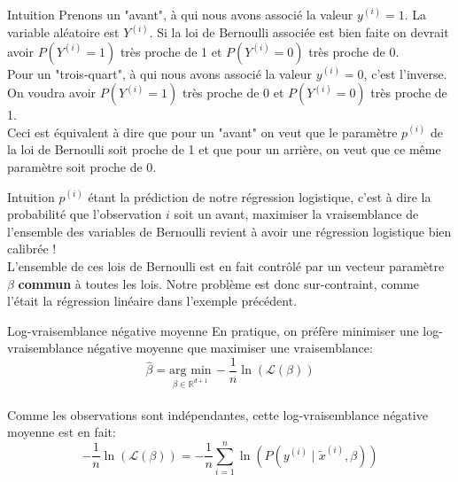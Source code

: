 \documentclass[10pt]{beamer}  %
\begin{document}
\begin{frame}{Intuition}
	Prenons un "avant", à qui nous avons associé la valeur $y^{(i)}=1$. La variable aléatoire est $Y^{(i)}$. Si la loi de Bernoulli associée est bien faite on devrait avoir $P(Y^{(i)} = 1)$ très proche de 1 et $P(Y^{(i)} = 0)$ très proche de 0. \\
	\vspace{0.5cm}
	\pause
	Pour un "trois-quart", à qui nous avons associé la valeur $y^{(i)}=0$, c'est l'inverse. On voudra avoir $P(Y^{(i)} = 1)$ très proche de 0 et $P(Y^{(i)} = 0)$ très proche de 1. \\
	\vspace{0.5cm}
	\pause
	Ceci est équivalent à dire que pour un "avant" on veut que le paramètre $p^{(i)}$ de la loi de Bernoulli soit proche de 1 et que pour un arrière, on veut que ce même paramètre soit proche de 0. \\
\end{frame}

\begin{frame}{Intuition}
	$p^{(i)}$ étant la prédiction de notre régression logistique, c'est à dire la probabilité que l'observation $i$ soit un avant, maximiser la vraisemblance de l'ensemble des variables de Bernoulli revient à avoir une régression logistique bien calibrée ! \\
	\vspace{0.5cm}
	\pause
	L'ensemble de ces lois de Bernoulli est en fait contrôlé par un vecteur paramètre $\beta$ \textbf{commun} à toutes les lois. Notre problème est donc sur-contraint, comme l'était la régression linéaire dans l'exemple précédent.	
\end{frame}

\begin{frame}{Log-vraisemblance négative moyenne}
	En pratique, on préfère minimiser une log-vraisemblance négative moyenne que maximiser une vraisemblance:
	\begin{equation}
		\hat{\beta} = \underset{\beta \in \mathbb{R}^{d+1}}{\text{arg min}} \, - \frac{1}{n} \ln{\left(\mathcal{L}(\beta)\right)}
		\nonumber
	\end{equation} \\
	\vspace{0.5cm}
	\pause
	Comme les observations sont indépendantes, cette log-vraisemblance négative moyenne est en fait:
	\begin{equation}
		- \frac{1}{n}\ln{\left(\mathcal{L}(\beta)\right)} = - \frac{1}{n} \sum_{i=1}^n \ln{\left(P(y^{(i)} \mid \tilde{x}^{(i)}, \beta)\right)}
		\nonumber
	\end{equation}
\end{frame}
\end{document}
